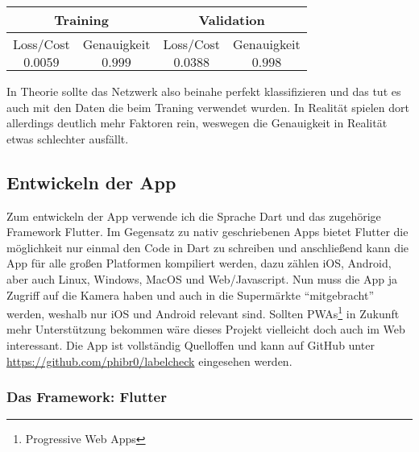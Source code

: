 \begin{table}[H]
  \centering
  \begin{tabular}{|c|c|c|c|}
  \hline
  \multicolumn{2}{|c|}{\textbf{Training}} & \multicolumn{2}{c|}{\textbf{Validation}} \\ \hline
  Loss/Cost         & Genauigkeit         & Loss/Cost          & Genauigkeit         \\ \hline
  $0.0059$           & $0.999$               & $0.0388$             & $0.998$               \\ \hline
  \end{tabular}
\end{table}

\noindent In Theorie sollte das Netzwerk also beinahe perfekt klassifizieren und das tut es auch mit den Daten die beim Traning verwendet wurden. In Realität spielen dort allerdings deutlich mehr Faktoren rein, weswegen die Genauigkeit in Realität etwas schlechter ausfällt.

\subsection{Entwickeln der App}

Zum entwickeln der App verwende ich die Sprache Dart und das zugehörige Framework Flutter. Im Gegensatz zu nativ geschriebenen Apps bietet Flutter die möglichkeit nur einmal den Code in Dart zu schreiben und anschließend kann die App für alle großen Platformen kompiliert werden, dazu zählen iOS, Android, aber auch Linux, Windows, MacOS und Web/Javascript. Nun muss die App ja Zugriff auf die Kamera haben und auch in die Supermärkte "`mitgebracht"' werden, weshalb nur iOS und Android relevant sind. Sollten PWAs\footnote{Progressive Web Apps} in Zukunft mehr Unterstützung bekommen wäre dieses Projekt vielleicht doch auch im Web interessant. Die App ist vollständig Quelloffen und kann auf GitHub unter \url{https://github.com/phibr0/labelcheck} eingesehen werden.

\subsubsection{Das Framework: Flutter}

